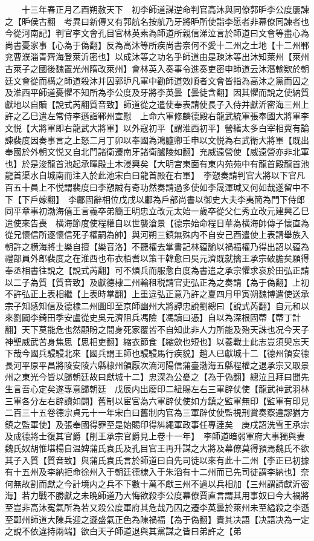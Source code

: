 　　十三年春正月乙酉朔赦天下　初李師道謀逆命判官高沐與同僚郭昈李公度屢諫之【昈侯古翻　考異曰新傳又有郭航名按航乃牙將昈所使詣李愿者非幕僚同諫者也今從河南記】判官李文會孔目官林英素為師道所親信涕泣言於師道曰文會等盡心為尚書憂家事【心為于偽翻】反為高沐等所疾尚書奈何不愛十二州之土地【十二州鄆兖曹濮淄青齊海登萊沂密也】以成沐等之功名乎師道由是疎沐等出沐知萊州【萊州古萊子之國後魏置光州隋改萊州】會林英入奏事令進奏吏密申師道云沐潛輸欵於朝廷文會從而構之師道殺沐并囚郭昈凡軍中勸師道效順者文會皆指為高沐之黨而囚之及淮西平師道憂懼不知所為李公度及牙將李英曇【曇徒含翻】因其懼而說之使納質獻地以自贖【說式芮翻質音致】師道從之遣使奉表請使長子入侍并獻沂密海三州上許之乙巳遣左常侍李遜詣鄆州宣慰　上命六軍修麟德殿右龍武統軍張奉國大將軍李文悦【大將軍即右龍武大將軍】以外寇初平【謂淮西初平】營繕太多白宰相冀有論諫裴度因奏事言之上怒二月丁卯以奉國為鴻臚卿壬申以文悦為右武衛大將軍【既出奉國於外朝文悦又自北門諸衛遷南牙諸衛臚陵如翻】充威遠營使【威遠營亦非北軍也】於是浚龍首池起承暉殿土木浸興矣【大明宫東面有東内苑苑中有龍首殿龍首池龍首渠水自城南而注入於此池宋白曰龍首殿在右軍】　李愬奏請判官大將以下官凡百五十員上不悦謂裴度曰李愬誠有奇功然奏請過多使如李晟渾瑊又何如哉遂留中不下【下戶嫁翻】　李鄘固辭相位戊戌以鄘為戶部尚書以御史大夫李夷簡為門下侍郎同平章事初渤海僖王言義卒弟簡王明忠立改元太始一歲卒從父仁秀立改元建興乙巳遣使來告喪　横海節度使程權自以世襲滄景【德宗始命程日華為横海帥傳子懷直為從兄懷信所逐懷信死子權嗣為帥】與河朔三鎮無殊内不自安己酉遣使上表請舉族入朝許之横海將士樂自擅【樂音洛】不聽權去掌書記林藴諭以禍福權乃得出詔以藴為禮部員外郎裴度之在淮西也布衣栢耆以策干韓愈曰吳元濟既就擒王承宗破膽矣願得奉丞相書往說之【說式芮翻】可不煩兵而服愈白度為書遣之承宗懼求哀於田弘正請以二子為質【質音致】及獻德棣二州輸租税請官吏弘正為之奏請【為于偽翻】上初不許弘正上表相繼【上表時掌翻】上重違弘正意乃許之夏四月甲寅朔魏博遣使送承宗子知感知信及德棣二州圖印至京師幽州大將譚忠說劉總曰【說式芮翻】自元和以來劉闢李錡田季安盧從史吳元濟阻兵馮險【馮讀曰憑】自以為深根固蔕【蔕丁計翻】天下莫能危也然顧盼之間身死家覆皆不自知此非人力所能及殆天誅也况今天子神聖威武苦身焦思【思相吏翻】縮衣節食【縮歛也短也】以養戰士此志豈須臾忘天下哉今國兵駸駸北來【國兵謂王師也駸駸馬行疾貌】趙人已獻城十二【德州領安德長河平原平昌將陵安陵六縣棣州領厭次滳河陽信蒲臺渤海五縣程權之退承宗又取景州之東光今皆以歸朝廷故曰獻城十二】忠深為公憂之【為于偽翻】總泣且拜曰聞先生言吾心定矣遂專意歸朝廷　戊辰内出廢印二紐賜左右三軍辟仗使【龍武神武羽林三軍各分左右辟讀如闢】舊制以宦官為六軍辟仗使如方鎮之監軍無印【監軍有印見二百三十五卷德宗貞元十一年宋白曰舊制内官為三軍辟仗使監視刑賞奏察違謬猶方鎮之監軍使】及張奉國得罪至是始賜印得糾繩軍政事任專逹矣　庚戌詔洗雪王承宗及成德將士復其官爵【削王承宗官爵見上卷十一年】　李師道暗弱軍府大事獨與妻魏氏奴胡惟堪楊自温婢蒲氏袁氏及孔目官王再升謀之大將及幕僚莫得預焉魏氏不欲其子入質【質音致】與蒲氏袁氏言於師道曰自先司徒以來有此十二州【李正已初據有十五州及李納拒命徐州入于朝廷德棣入于朱滔有十二州而已先司徒謂李納也】奈何無故割而獻之今計境内之兵不下數十萬不獻三州不過以兵相加【三州謂請獻沂密海】若力戰不勝獻之未晩師道乃大悔欲殺李公度幕僚賈直言謂其用事奴曰今大禍將至豈非高沐寃氣所為若又殺公度軍府其危哉乃囚之遷李英曇於萊州未至縊殺之李遜至鄆州師道大陳兵迎之遜盛氣正色為陳禍福【為于偽翻】責其决語【决語决為一定之說不依違持兩端】欲白天子師道退與其黨謀之皆曰弟許之【弟